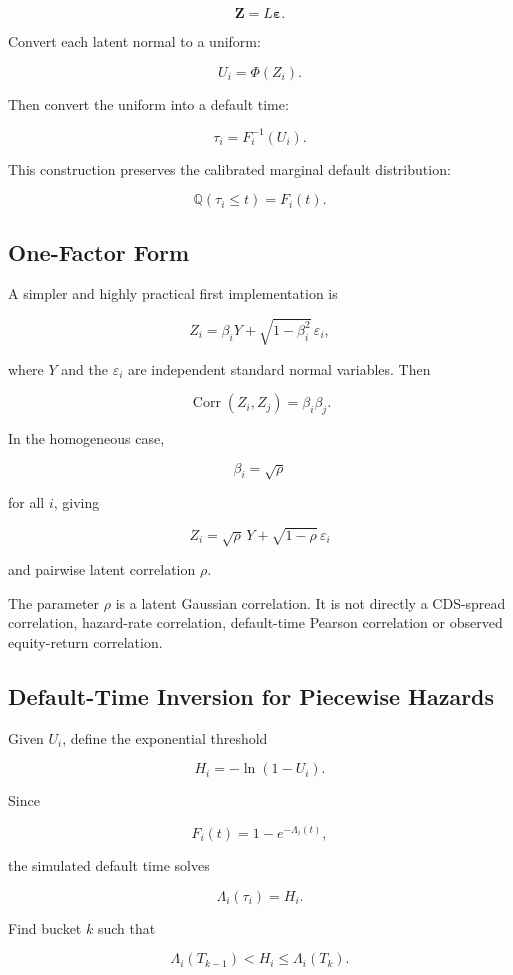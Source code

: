 \documentclass[11pt,a4paper]{article}
\newcommand{\Q}{\mathbb{Q}}
\begin{document}
\[
\mathbf Z=L\boldsymbol{\varepsilon}.
\]

Convert each latent normal to a uniform:

\[
U_i=\Phi(Z_i).
\]

Then convert the uniform into a default time:

\[
\tau_i=F_i^{-1}(U_i).
\]

This construction preserves the calibrated marginal default distribution:

\[
\Q(\tau_i\leq t)=F_i(t).
\]

\subsection{One-Factor Form}

A simpler and highly practical first implementation is

\[
Z_i
=
\beta_iY
+
\sqrt{1-\beta_i^2}\,\varepsilon_i,
\]

where $Y$ and the $\varepsilon_i$ are independent standard normal variables. Then

\[
\operatorname{Corr}(Z_i,Z_j)=\beta_i\beta_j.
\]

In the homogeneous case,

\[
\beta_i=\sqrt{\rho}
\]

for all $i$, giving

\[
Z_i
=
\sqrt{\rho}\,Y
+
\sqrt{1-\rho}\,\varepsilon_i
\]

and pairwise latent correlation $\rho$.

The parameter $\rho$ is a latent Gaussian correlation. It is not directly a CDS-spread correlation, hazard-rate correlation, default-time Pearson correlation or observed equity-return correlation.

\subsection{Default-Time Inversion for Piecewise Hazards}

Given $U_i$, define the exponential threshold

\[
H_i=-\ln(1-U_i).
\]

Since

\[
F_i(t)=1-e^{-\Lambda_i(t)},
\]

the simulated default time solves

\[
\Lambda_i(\tau_i)=H_i.
\]

Find bucket $k$ such that

\[
\Lambda_i(T_{k-1})<H_i\leq\Lambda_i(T_k).
\]
\end{document}
